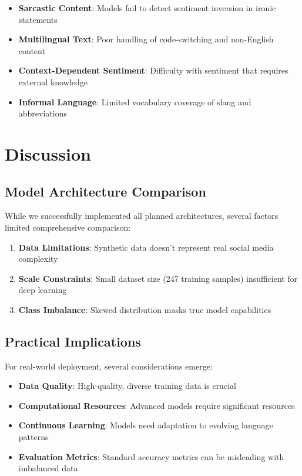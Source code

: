 \documentclass[11pt,a4paper]{article}
\begin{document}
\begin{itemize}
    \item \textbf{Sarcastic Content}: Models fail to detect sentiment inversion in ironic statements
    \item \textbf{Multilingual Text}: Poor handling of code-switching and non-English content
    \item \textbf{Context-Dependent Sentiment}: Difficulty with sentiment that requires external knowledge
    \item \textbf{Informal Language}: Limited vocabulary coverage of slang and abbreviations
\end{itemize}

\section{Discussion}

\subsection{Model Architecture Comparison}

While we successfully implemented all planned architectures, several factors limited comprehensive comparison:

\begin{enumerate}
    \item \textbf{Data Limitations}: Synthetic data doesn't represent real social media complexity
    \item \textbf{Scale Constraints}: Small dataset size (247 training samples) insufficient for deep learning
    \item \textbf{Class Imbalance}: Skewed distribution masks true model capabilities
\end{enumerate}

\subsection{Practical Implications}

For real-world deployment, several considerations emerge:

\begin{itemize}
    \item \textbf{Data Quality}: High-quality, diverse training data is crucial
    \item \textbf{Computational Resources}: Advanced models require significant resources
    \item \textbf{Continuous Learning}: Models need adaptation to evolving language patterns
    \item \textbf{Evaluation Metrics}: Standard accuracy metrics can be misleading with imbalanced data
\end{itemize}
\end{document}
